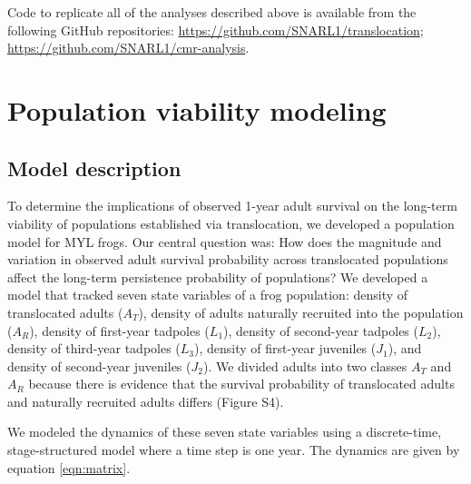 \documentclass[9pt,twocolumn,twoside,lineno]{pnas-new}
\begin{document}
{Code to replicate all of the analyses described above is available from
the following GitHub repositories:
\url{https://github.com/SNARL1/translocation};
\url{https://github.com/SNARL1/cmr-analysis}.

\hypertarget{population-viability-modeling}{%
\section*{Population viability
modeling}\label{population-viability-modeling}}

\hypertarget{model-description}{%
\subsection*{Model description}\label{model-description}}

To determine the implications of observed 1-year adult survival on the
long-term viability of populations established via translocation, we
developed a population model for MYL frogs. Our central question was:
How does the magnitude and variation in observed adult survival
probability across translocated populations affect the long-term
persistence probability of populations? We developed a model that
tracked seven state variables of a frog population: density of
translocated adults (\(A_T\)), density of adults naturally recruited
into the population (\(A_R\)), density of first-year tadpoles (\(L_1\)),
density of second-year tadpoles (\(L_2\)), density of third-year
tadpoles (\(L_3\)), density of first-year juveniles (\(J_1\)), and
density of second-year juveniles (\(J_2\)). We divided adults into two
classes \(A_T\) and \(A_R\) because there is evidence that the survival
probability of translocated adults and naturally recruited adults
differs (Figure S4).

We modeled the dynamics of these seven state variables using a
discrete-time, stage-structured model where a time step is one year. The
dynamics are given by equation \ref{eqn:matrix}.

}
\end{document}
